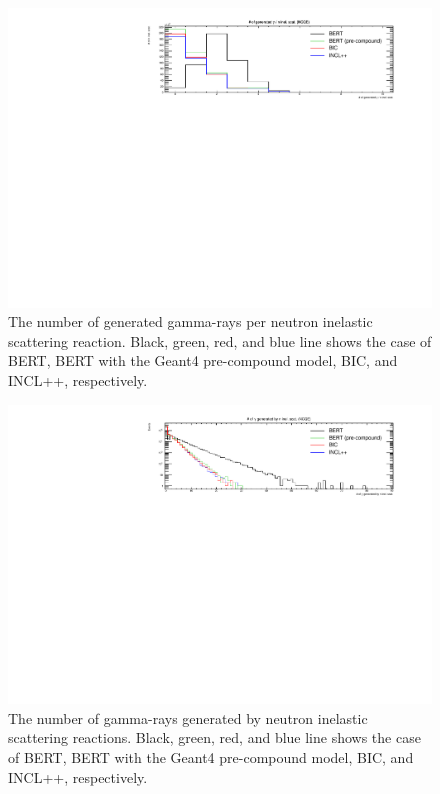 \begin{figure}[h]
	\centering
	\includegraphics[width=16cm]{PDF/Secondary/Comparison_PreCompound/onlyNCQE_gamma/pdf1/NumSecIne}
	\caption[The number of generated gamma-rays per neutron inelastic scattering reaction]{
	The number of generated gamma-rays per neutron inelastic scattering reaction.
	Black, green, red, and blue line shows the case of BERT, BERT with the Geant4 pre-compound model, BIC, and INCL++, respectively.
	}\label{Pre_gamma_NumSecIne}
\end{figure}

\begin{figure}[h]
	\centering
	\includegraphics[width=16cm]{PDF/Secondary/Comparison_PreCompound/onlyNCQE_gamma/pdf1/Logy_NumSec}
	\caption[The number of gamma-rays generated by neutron inelastic scattering reactions]{
	The number of gamma-rays generated by neutron inelastic scattering reactions.
	Black, green, red, and blue line shows the case of BERT, BERT with the Geant4 pre-compound model, BIC, and INCL++, respectively.
	}\label{Pre_gamma_Logy_NumSec}
\end{figure}

